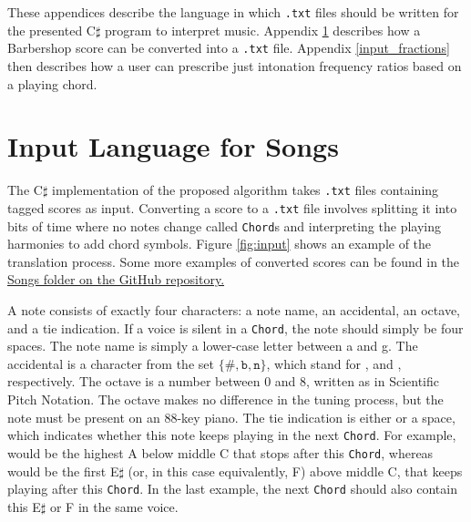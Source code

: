 \documentclass[a4paper]{article}
\begin{document}
\begin{appendices}
These appendices describe the language in which \texttt{.txt} files should be written for the presented C$\sharp$ program to interpret music. Appendix \ref{input_songs} describes how a Barbershop score can be converted into a \texttt{.txt} file. Appendix \ref{input_fractions} then describes how a user can prescribe just intonation frequency ratios based on a playing chord.

\section{Input Language for Songs}
\label{input_songs}
The C$\sharp$ implementation of the proposed algorithm takes \texttt{.txt} files containing tagged scores as input. Converting a score to a \texttt{.txt} file involves splitting it into bits of time where no notes change called \texttt{Chord}s and interpreting the playing harmonies to add chord symbols. Figure \ref{fig:input} shows an example of the translation process. Some more examples of converted scores can be found in the \href{https://github.com/teuncb/AdaptiveBarbershop/tree/main/Songs}{Songs folder on the GitHub repository.}

A note consists of exactly four characters: a note name, an accidental, an octave, and a tie indication. If a voice is silent in a \texttt{Chord}, the note should simply be four spaces. The note name is simply a lower-case letter between a and g. The accidental is a character from the set $\{\texttt{\#}, \texttt{b}, \texttt{n}\}$, which stand for ,  and , respectively. The octave is a number between 0 and 8, written as in Scientific Pitch Notation. \cite{pollens_pitch_2022} The octave makes no difference in the tuning process, but the note must be present on an 88-key piano. The tie indication is either  or a space, which indicates whether this note keeps playing in the next \texttt{Chord}. For example,  would be the highest A below middle C that stops after this \texttt{Chord}, whereas  would be the first E$\sharp$ (or, in this case equivalently, F) above middle C, that keeps playing after this \texttt{Chord}. In the last example, the next \texttt{Chord} should also contain this E$\sharp$ or F in the same voice.


\end{appendices}
\end{document}
